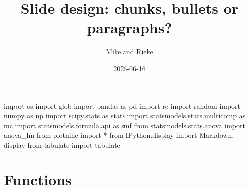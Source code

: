 \documentclass[
  letterpaper,
  DIV=11,
  numbers=noendperiod]{scrartcl}
\title{Slide design: chunks, bullets or paragraphs?}
\author{Mike and Rieke}
\date{2026-06-16}
\newenvironment{Shaded}{\begin{snugshade}}{\end{snugshade}}
\newcommand{\ImportTok}[1]{\textcolor[rgb]{0.00,0.46,0.62}{#1}}
\newcommand{\NormalTok}[1]{\textcolor[rgb]{0.00,0.23,0.31}{#1}}
\newcommand{\OperatorTok}[1]{\textcolor[rgb]{0.37,0.37,0.37}{#1}}
\renewcommand*\contentsname{Table of contents}
\newcommand\contentsname{Table of contents}
\begin{document}
\maketitle

\renewcommand*\contentsname{Table of contents}
{
\setcounter{tocdepth}{3}
\tableofcontents
}

\begin{Shaded}
\begin{Highlighting}[]
\ImportTok{import}\NormalTok{ os}
\ImportTok{import}\NormalTok{ glob}
\ImportTok{import}\NormalTok{ pandas }\ImportTok{as}\NormalTok{ pd}
\ImportTok{import}\NormalTok{ re}
\ImportTok{import}\NormalTok{ random}
\ImportTok{import}\NormalTok{ numpy }\ImportTok{as}\NormalTok{ np}
\ImportTok{import}\NormalTok{ scipy.stats }\ImportTok{as}\NormalTok{ stats}
\ImportTok{import}\NormalTok{ statsmodels.stats.multicomp }\ImportTok{as}\NormalTok{ mc}
\ImportTok{import}\NormalTok{ statsmodels.formula.api }\ImportTok{as}\NormalTok{ smf}
\ImportTok{from}\NormalTok{ statsmodels.stats.anova }\ImportTok{import}\NormalTok{ anova\_lm}
\ImportTok{from}\NormalTok{ plotnine }\ImportTok{import} \OperatorTok{*} 
\ImportTok{from}\NormalTok{ IPython.display }\ImportTok{import}\NormalTok{ Markdown, display}
\ImportTok{from}\NormalTok{ tabulate }\ImportTok{import}\NormalTok{ tabulate}
\end{Highlighting}
\end{Shaded}

\section{Functions}\label{functions}
\end{document}
